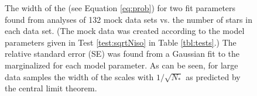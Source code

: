 

\begin{figure}[!htbp]
\caption{The width of the \pdf{} (see Equation \ref{eq:prob}) for two fit parameters found from analyses of 132 mock data sets vs. the number of stars in each data set. (The mock data was created according to the model parameters given in Test \ref{test:sqrtNiso} in Table \ref{tbl:tests}.) The relative standard error (SE) was found from a Gaussian fit to the marginalized \pdf{} for each model parameter. As can be seen, for large data samples the width of the \pdf{} scales with $1/\sqrt{N_{*}}$ as predicted by the central limit theorem.} 
\label{fig:sqrtNiso}
\end{figure}




